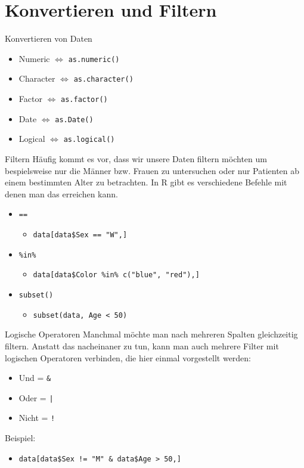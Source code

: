 \documentclass[xcolor=dvipsnames, aspectratio = 169]{beamer}
\begin{document}
\section{Konvertieren und Filtern}
\begin{frame}[fragile]{Konvertieren von Daten}
	\begin{itemize}
		\item Numeric $\Leftrightarrow$ \verb+as.numeric()+
		\item Character $\Leftrightarrow$ \verb+as.character()+
		\item Factor $\Leftrightarrow$ \verb+as.factor()+
		\item Date $\Leftrightarrow$ \verb+as.Date()+
		\item Logical $\Leftrightarrow$ \verb+as.logical()+
	\end{itemize}
\end{frame}



\begin{frame}[fragile]{Filtern}
Häufig kommt es vor, dass wir unsere Daten filtern möchten um bespielsweise nur die Männer bzw. Frauen zu untersuchen oder nur Patienten ab einem bestimmten Alter zu betrachten. In R gibt es verschiedene Befehle mit denen man das erreichen kann.
	\begin{itemize}
		\item  \verb+==+
		\begin{itemize}
			\item  \verb+data[data$Sex == "W",]+
		\end{itemize}
		\item  \verb+%in%+
		\begin{itemize}
			\item  \verb+data[data$Color %in% c("blue", "red"),]+
		\end{itemize}
		\item  \verb+subset()+
		\begin{itemize}
			\item  \verb+subset(data, Age < 50)+
		\end{itemize}
	\end{itemize}
\end{frame}

\begin{frame}[fragile]{Logische Operatoren}
Manchmal möchte man nach mehreren Spalten gleichzeitig filtern. Anstatt das nacheinaner zu tun, kann man auch mehrere Filter mit logischen Operatoren verbinden, die hier einmal vorgestellt werden: \\
\begin{itemize}
			\item  Und = \verb+&+
			\item  Oder = \verb+|+
			\item Nicht = \verb+!+
\end{itemize}
Beispiel:
	\begin{itemize}
		\item  \verb+data[data$Sex != "M" & data$Age > 50,]+
	\end{itemize}
\end{frame}
\end{document}
